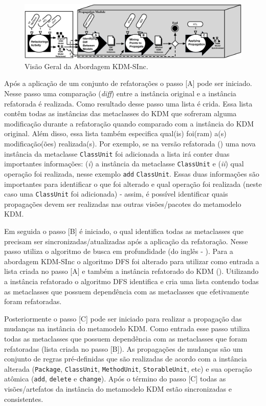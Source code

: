 \begin{figure}[h]
	\centering
	\caption{Visão Geral da Abordagem KDM-SInc.}
	\label{fig:kdm_sinc}
	\includegraphics[scale=0.5]{images/ApproachLifeCicle2}
	\fautor
\end{figure}

Após a aplicação de um conjunto de refatorações o passo [A] pode ser iniciado. Nesse passo uma comparação (\textit{diff}) entre a instância original e a instância refatorada é realizada. Como resultado desse passo uma lista é crida. Essa lista contêm todas as instâncias das metaclasses do KDM que sofreram alguma modificação durante a refatoração quando comparado com a instância do KDM original. Além disso, essa lista também especifica qual(is) foi(ram) a(s) modificação(ões) realizada(s). Por exemplo, se na versão refatorada () uma nova instância da metaclasse \texttt{ClassUnit} foi adicionada a lista irá conter duas importantes informações: (\textit{i}) a instância da metaclasse \texttt{ClassUnit} e (\textit{ii}) qual operação foi realizada, nesse exemplo \texttt{add} \texttt{ClassUnit}. Essas duas informações são importantes para identificar o que foi alterado e qual operação foi realizada (neste caso uma \texttt{ClassUnit} foi adicionada) - assim, é possível identificar quais propagações devem ser realizadas nas outras visões/pacotes do metamodelo KDM.

Em seguida o passo [B] é iniciado, o qual identifica todas as metaclasses que precisam ser sincronizadas/atualizadas após a aplicação da refatoração. Nesse passo utiliza o algoritmo de busca em profundidade (do inglês - ). Para a abordagem KDM-SInc o algoritmo DFS foi alterado para utilizar como entrada a lista criada no passo [A] e também a instância refatorado do KDM (). Utilizando a instância refatorado o algoritmo DFS identifica e cria uma lista contendo todas as metaclasses que possuem dependência com as metaclasses que efetivamente foram refatoradas.

Posteriormente o passo [C] pode ser iniciado para realizar a propagação das mudanças na instância do metamodelo KDM. Como entrada esse passo utiliza todas as metaclasses que possuem dependência com as metaclasses que foram refatoradas (lista criada no passo [B]). As propagações de mudanças são um conjunto de regras pré-definidas que são realizadas de acordo com a instância alterada (\texttt{Package}, \texttt{ClassUnit}, \texttt{MethodUnit}, \texttt{StorableUnit}, etc) e sua operação atômica (\texttt{add}, \texttt{delete} e \texttt{change}). Após o término do passo [C] todas as visões/artefatos da instância do metamodelo KDM estão sincronizadas e consistentes.

